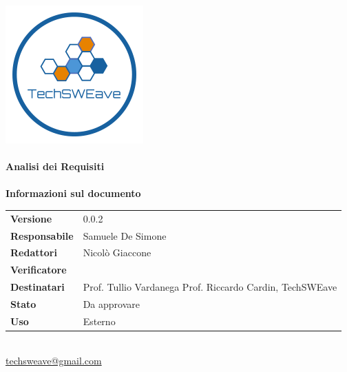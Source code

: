 \documentclass[a4paper]{article}
\begin{document}
\begin{titlepage}
    \begin{center}
        \includegraphics{../../../Images/logo}\\
        \vspace{20px}
        \textcolor{logo}{\hrulefill}\\
        \vspace{20px}
        \textbf{\huge\textcolor{logo}{Analisi dei Requisiti}}\\
        \vspace{10px}
        \textcolor{logo}{\hrulefill}\\
        \vspace{40px}
        \textbf{\Large Informazioni sul documento}\\
        \vspace{20px}
        \begin{tabular}{p{100px} | p{100px}}
            \textbf{Versione} & 0.0.2\\
            \textbf{Responsabile} & Samuele De Simone\\
            \textbf{Redattori} & Nicolò Giaccone\\
            \textbf{Verificatore} & \\
            \textbf{Destinatari} & Prof. Tullio Vardanega \newline Prof. Riccardo Cardin, \newline TechSWEave\\
            \textbf{Stato} & Da approvare\\
            \textbf{Uso} & Esterno\\
        \end{tabular}\\
        \vspace{60px}
        \href{mailto:techsweave@gmail.com}{techsweave@gmail.com}\\

    \end{center}
    \end{titlepage}
\end{document}

